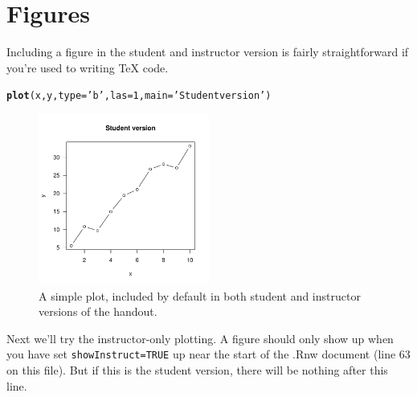 \documentclass[letterpaper]{article}\usepackage[]{graphicx}\usepackage[]{color}
\makeatletter
\newcommand{\hlnum}[1]{\textcolor[rgb]{0.686,0.059,0.569}{#1}}%
\newcommand{\hlstr}[1]{\textcolor[rgb]{0.192,0.494,0.8}{#1}}%
\newcommand{\hlstd}[1]{\textcolor[rgb]{0.345,0.345,0.345}{#1}}%
\newcommand{\hlkwc}[1]{\textcolor[rgb]{0.333,0.667,0.333}{#1}}%
\newcommand{\hlkwd}[1]{\textcolor[rgb]{0.737,0.353,0.396}{\textbf{#1}}}%
\newenvironment{kframe}{%
 \def\at@end@of@kframe{}%
 \ifinner\ifhmode%
  \def\at@end@of@kframe{\end{minipage}}%
  \begin{minipage}{\columnwidth}%
 \fi\fi%
 \def\FrameCommand##1{\hskip\@totalleftmargin \hskip-\fboxsep
 \colorbox{shadecolor}{##1}\hskip-\fboxsep
     \hskip-\linewidth \hskip-\@totalleftmargin \hskip\columnwidth}%
 \MakeFramed {\advance\hsize-\width
   \@totalleftmargin\z@ \linewidth\hsize
   \@setminipage}}%
 {\par\unskip\endMakeFramed%
 \at@end@of@kframe}
\newenvironment{knitrout}{}{} %
\makeatother
\begin{document}
\section{Figures}

Including a figure in the student and instructor version is fairly 
straightforward if you're used to writing TeX code.

\begin{knitrout}
\color{fgcolor}\begin{kframe}
\begin{alltt}
\hlkwd{plot}\hlstd{(x,y,} \hlkwc{type} \hlstd{=} \hlstr{'b'}\hlstd{,} \hlkwc{las} \hlstd{=} \hlnum{1}\hlstd{,} \hlkwc{main}\hlstd{=}\hlstr{'Student version'}\hlstd{)}
\end{alltt}
\end{kframe}
\end{knitrout}
\begin{figure}[H]
\centering
\includegraphics[width=0.5\textwidth]{figs/studentPlot-1}
\caption{A simple plot, included by default in both student and instructor
versions of the handout.}
\label{fig:studentPlot}
\end{figure}

Next we'll try the instructor-only plotting. A figure should only show up
when you have set \texttt{showInstruct=TRUE} up near the start of the .Rnw
document (line 63 on this file). But if this is the student version, there will 
be nothing after this line. 






\end{document}
